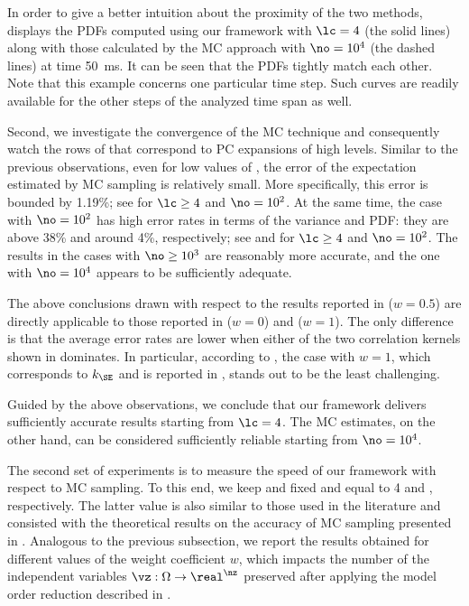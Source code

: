 In order to give a better intuition about the proximity of the two methods,
 displays the \acp{PDF} computed using our
framework with $\lc = 4$ (the solid lines) along with those calculated by the
\ac{MC} approach with $\no = 10^4$ (the dashed lines) at time 50~ms. It can be
seen that the \acp{PDF} tightly match each other. Note that this example
concerns one particular time step. Such curves are readily available for the
other steps of the analyzed time span as well.

Second, we investigate the convergence of the \ac{MC} technique and consequently
watch the rows of  that correspond to \ac{PC}
expansions of high levels. Similar to the previous observations, even for low
values of \no, the error of the expectation estimated by \ac{MC} sampling is
relatively small. More specifically, this error is bounded by 1.19\%; see
\error{\expectation} for $\lc \geq 4$ and $\no = 10^2$. At the same time, the
case with $\no = 10^2$ has high error rates in terms of the variance and
\ac{PDF}: they are above 38\% and around 4\%, respectively; see
\error{\variance} and  for $\lc \geq 4$ and $\no = 10^2$. The results
in the cases with $\no \geq 10^3$ are reasonably more accurate, and the one with
$\no = 10^4$ appears to be sufficiently adequate.

The above conclusions drawn with respect to the results reported in
 ($w = 0.5$) are directly applicable to those
reported in  ($w = 0$) and
 ($w = 1$). The only difference is that the
average error rates are lower when either of the two correlation kernels shown
in  dominates. In particular, according to
\error{\variance}, the case with $w = 1$, which corresponds to $k_\SE$ and is
reported in , stands out to be the least
challenging.

Guided by the above observations, we conclude that our framework delivers
sufficiently accurate results starting from $\lc = 4$. The \ac{MC} estimates, on
the other hand, can be considered sufficiently reliable starting from $\no =
10^4$.


The second set of experiments is to measure the speed of our framework with
respect to \ac{MC} sampling. To this end, we keep \lc and \no fixed and equal to
4 and , respectively. The latter value is also similar to those
used in the literature \cite{ghanta2006, bhardwaj2008, huang2009a, shen2009,
xiang2010, juan2012, lee2013} and consisted with the theoretical results on the
accuracy of \ac{MC} sampling presented in \cite{diaz-emparanza2002}. Analogous
to the previous subsection, we report the results obtained for different values
of the weight coefficient $w$, which impacts the number of the independent
variables $\vz: \Omega \to \real^\nz$ preserved after applying the model order
reduction described in .


